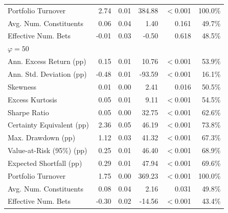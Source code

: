 \begin{tabular*}{\textwidth}{l@{\extracolsep{\fill}}rrrrr}
Portfolio Turnover & 2.74 & 0.01 & 384.88 & $<$0.001 & 100.0\% \\
Avg. Num. Constituents & 0.06 & 0.04 & 1.40 & 0.161 & 49.7\% \\
Effective Num. Bets & -0.01 & 0.03 & -0.50 & 0.618 & 48.5\% \\
\midrule
\multicolumn{6}{l}{\textit{$\varphi = 50$}} \\
\midrule
Ann. Excess Return (pp) & 0.15 & 0.01 & 10.76 & $<$0.001 & 53.9\% \\
Ann. Std. Deviation (pp) & -0.48 & 0.01 & -93.59 & $<$0.001 & 16.1\% \\
Skewness & 0.01 & 0.00 & 2.41 & 0.016 & 50.5\% \\
Excess Kurtosis & 0.05 & 0.01 & 9.11 & $<$0.001 & 54.5\% \\
Sharpe Ratio & 0.05 & 0.00 & 32.75 & $<$0.001 & 62.6\% \\
Certainty Equivalent (pp) & 2.36 & 0.05 & 46.19 & $<$0.001 & 73.8\% \\
Max. Drawdown (pp) & 1.12 & 0.03 & 41.32 & $<$0.001 & 67.3\% \\
Value-at-Risk (95\%) (pp) & 0.25 & 0.01 & 46.40 & $<$0.001 & 68.9\% \\
Expected Shortfall (pp) & 0.29 & 0.01 & 47.94 & $<$0.001 & 69.6\% \\
Portfolio Turnover & 1.75 & 0.00 & 369.23 & $<$0.001 & 100.0\% \\
Avg. Num. Constituents & 0.08 & 0.04 & 2.16 & 0.031 & 49.8\% \\
Effective Num. Bets & -0.30 & 0.02 & -14.56 & $<$0.001 & 43.4\% \\
\bottomrule
\end{tabular*}
